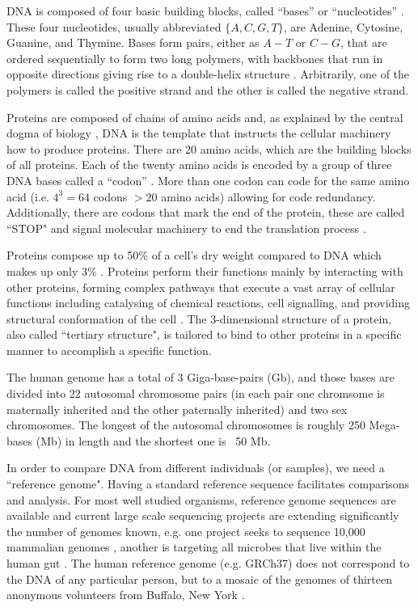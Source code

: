 DNA is composed of four basic building blocks, called ``bases'' or ``nucleotides'' \cite{alberts1995molecular}. 
These four nucleotides, usually abbreviated $\{A, C, G, T\}$, are Adenine, Cytosine, Guanine, and Thymine. 
Bases form pairs, either as $A-T$ or $C-G$, that are ordered sequentially to form two long polymers, with backbones that run in opposite directions giving rise to a double-helix structure \cite{watson1953molecular}. 
Arbitrarily, one of the polymers is called the positive strand and the other is called the negative strand. 

Proteins are composed of chains of amino acids and, as explained by the central dogma of biology \cite{alberts1995molecular},  DNA is the template that instructs the cellular machinery how to produce proteins. 
There are 20 amino acids, which are the building blocks of all proteins. Each of the twenty amino acids is encoded by a group of three DNA bases called a ``codon'' \cite{crick1961general}. 
More than one codon can code for the same amino acid (i.e. $4^3=64$ codons $ > 20 $ amino acids) allowing for code redundancy. 
Additionally, there are codons that mark the end of the protein, these are called ``STOP" and signal molecular machinery to end the translation process \cite{brenner1965genetic}.

Proteins compose up to 50\% of a cell's dry weight compared to DNA which makes up only 3\% \cite{alberts1995molecular}. 
Proteins perform their functions mainly by interacting with other proteins, forming complex pathways that execute a vast array of cellular functions including catalysing of chemical reactions, cell signalling, and providing structural conformation of the cell \cite{alberts1995molecular}. 
The 3-dimensional structure of a protein, also called ``tertiary structure", is tailored to bind to other proteins in a specific manner to accomplish a specific function. 

The human genome has a total of 3 Giga-base-pairs (Gb), and those bases are divided into 22 autosomal chromosome pairs (in each pair one chromsome is maternally inherited and the other paternally inherited) and two sex chromosomes. 
The longest of the autosomal chromosomes is roughly 250 Mega-bases (Mb) in length and the shortest one is ~50 Mb.

In order to compare DNA from different individuals (or samples), we need a ``reference genome". 
Having a standard reference sequence facilitates comparisons and analysis. 
For most well studied organisms, reference genome sequences are available and current large scale sequencing projects are extending significantly the number of genomes known, e.g. one project seeks to sequence 10,000 mammalian genomes \cite{haussler2009genome}, another is targeting all microbes that live within the human gut \cite{turnbaugh2007human}. 
The human reference genome (e.g. GRCh37) does not correspond to the DNA of any particular person, but to a mosaic of the genomes of thirteen anonymous volunteers from Buffalo, New York \cite{schneider2013genome}.


